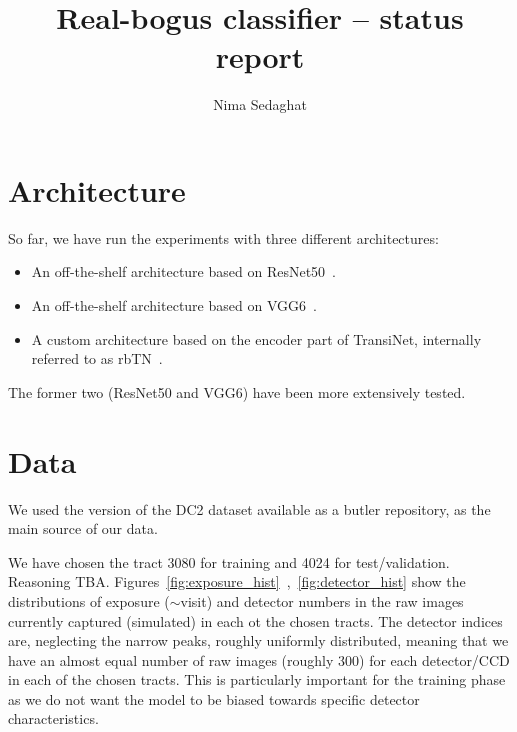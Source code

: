 \documentclass[DM,authoryear,toc]{lsstdoc}
\title{Real-bogus classifier -- status report}
\author{%
Nima Sedaghat
}
\date{\vcsDate}
\begin{document}
\maketitle


\section{Architecture}
So far, we have run the experiments with three different architectures:

\begin{itemize}
\item{An off-the-shelf architecture based on ResNet50~\citep{he2016deep}.}
\item{An off-the-shelf architecture based on VGG6~\citep{simonyan2014very}.}
\item{A custom architecture based on the encoder part of TransiNet, internally referred to as rbTN~\citep{sedaghat2018effective}.}
\end{itemize}

The former two (ResNet50 and VGG6) have been more extensively tested.

\section{Data}
We used the version of the DC2 dataset available as a butler repository, as the main source of our data.

We have chosen the tract 3080 for training and 4024 for test/validation. Reasoning TBA.
Figures~\ref{fig:exposure_hist}~,~\ref{fig:detector_hist} show the distributions of exposure ($\sim$visit) and detector numbers in the raw images currently captured (simulated) in each ot the chosen tracts. The detector indices are, neglecting the narrow peaks, roughly uniformly distributed, meaning that we have an almost equal number of raw images (roughly 300) for each detector/CCD in each of the chosen tracts. This is particularly important for the training phase as we do not want the model to be biased towards specific detector characteristics.
\end{document}

